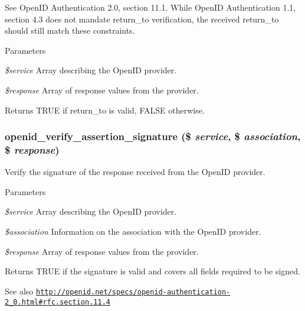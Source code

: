 See OpenID Authentication 2.0, section 11.1. While OpenID Authentication 1.1, section 4.3 does not mandate return\_\-to verification, the received return\_\-to should still match these constraints.


\begin{DoxyParams}{Parameters}
\item[{\em \$service}]Array describing the OpenID provider. \item[{\em \$response}]Array of response values from the provider.\end{DoxyParams}
\begin{DoxyReturn}{Returns}
TRUE if return\_\-to is valid, FALSE otherwise. 
\end{DoxyReturn}
\hypertarget{openid_8module_ab2abb87e4bd165165d3c851c8a2ac344}{
\subsubsection[{openid\_\-verify\_\-assertion\_\-signature}]{\setlength{\rightskip}{0pt plus 5cm}openid\_\-verify\_\-assertion\_\-signature (\$ {\em service}, \/  \$ {\em association}, \/  \$ {\em response})}}
\label{openid_8module_ab2abb87e4bd165165d3c851c8a2ac344}
Verify the signature of the response received from the OpenID provider.


\begin{DoxyParams}{Parameters}
\item[{\em \$service}]Array describing the OpenID provider. \item[{\em \$association}]Information on the association with the OpenID provider. \item[{\em \$response}]Array of response values from the provider.\end{DoxyParams}
\begin{DoxyReturn}{Returns}
TRUE if the signature is valid and covers all fields required to be signed. 
\end{DoxyReturn}
\begin{DoxySeeAlso}{See also}
\href{http://openid.net/specs/openid-authentication-2_0.html#rfc.section.11.4}{\tt http://openid.net/specs/openid-\/authentication-\/2\_\-0.html\#rfc.section.11.4} 
\end{DoxySeeAlso}
